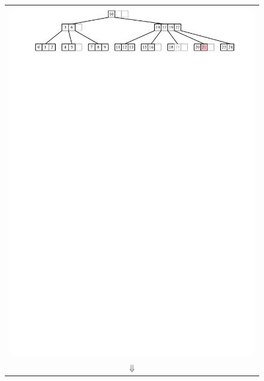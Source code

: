 \begin{figure}
{\begin{tabular}{@{}l@{}}
     \includegraphics[width=\ScaleIfNeeded]{figs/btree-add-2} \\[2ex]
     \multicolumn{1}{c}{$\Downarrow$} \\[2ex]

\end{tabular}}
\end{figure}
